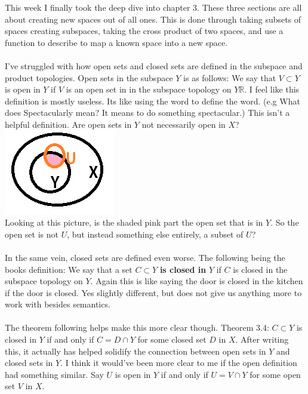 \documentclass[10pt]{article}
\begin{document}
This week I finally took the deep dive into chapter 3. These three sections are all about creating new spaces out of all ones. This is done through taking subsets of spaces creating subspaces, taking the cross product of two spaces, and use a function to describe to map a known space into a new space. \\
\\
I've struggled with how open sets and closed sets are defined in the subspace and product topologies. Open sets in the subspace $ Y $ is as follows: We say that $ V\subset Y $ is open in $ Y $ if $ V $ is an open set in in the subspace topology on $ Y \mathbb{R} $. I feel like this definition is mostly useless. Its like using the word to define the word. (e.g What does Spectacularly mean? It means to do something spectacular.) This isn't a helpful definition. Are open sets in $ Y $ not necessarily open in $ X $?\\
\includegraphics*[scale=.4]{Open-Sets-in-Y.png}
 \\
 Looking at this picture, is the shaded pink part the open set that is in $ Y $. So the open set is not $ U$, but instead something else entirely, a subset of $ U $?\\
\\
In the same vein, closed sets are defined even worse. The following being the books definition: We say that a set $ C\subset Y $ \textbf{is closed in} $ Y $ if $ C $ is closed in the subspace topology on $ Y $. Again this is like saying the door is closed in the kitchen if the door is closed. Yes slightly different, but does not give us anything more to work with besides semantics.\\
\\
The theorem following helps make this more clear though. Theorem 3.4: $ C\subset Y $ is closed in $ Y $ if and only if $ C=D\cap Y $ for some closed set $ D $ in $ X $. After writing this, it actually has helped solidify the connection between open sets in $ Y $ and closed sets in $ Y $. I think it would've been more clear to me if the open definition had something similar. Say $ U $ is open in $ Y $ if and only if $ U=V\cap Y $ for some open set $ V $ in $ X $.\\
\end{document}
